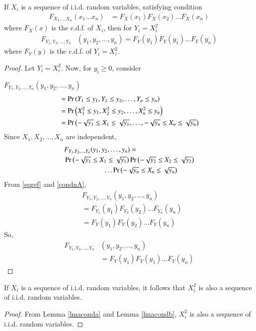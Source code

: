 \documentclass[journal,12pt,twocolumn]{IEEEtran}
\begin{document}
\begin{lemma} \label{lmacondb}
    If $X_i$ is a sequence of i.i.d. random variables, satisfying condition
    \begin{align}
        F_{X_1,\ldots X_n}(x_1\ldots x_n)&=F_X(x_1)F_X(x_2)\ldots F_X(x_n)\label{maincondnB}
    \end{align} 
    where $F_{X}(x)$ is the c.d.f. of $X_i$, then for $Y_i = X_i^2$
    \begin{align}
    F_{Y_1,Y_2,\dots,Y_n}&(y_1,y_2,\dots,y_n)=F_Y(y_1)F_Y(y_1)\dots F_Y(y_n)
    \end{align}
    where $F_Y(y)$ is the c.d.f. of $Y_i=X_i^2$.
\end{lemma}
\begin{proof}
Let $Y_i = X_i^2$.
Now, for $y_i\geq0$, consider

\begin{math}
    F_{Y_1,Y_2,\ldots,Y_n}(y_1,y_2,\ldots,y_n)
\end{math}
\begin{align}
    &=\Pr\left(Y_1 \leq y_1,Y_2 \leq y_2,\ldots,Y_n \leq y_n\right)\\
    &=\Pr\left(X_1^2 \leq y_1,X_2^2 \leq y_2,\ldots,X_n^2 \leq y_n\right)\\
    &=\Pr\left(-\sqrt{y_1} \leq X_1 \leq \sqrt{y_1},\ldots,-\sqrt{y_n} \leq X_n \leq \sqrt{y_n}\right)
\end{align}
Since $X_1,X_2,\ldots,X_n$ are independent,
\begin{align}
    &F_{Y_1,Y_2,\dots,Y_n}(y_1,y_2,\dots,y_n)= \nonumber\\
    &\Pr\left(-\sqrt{y_1} \leq X_1 \leq \sqrt{y_1}\right) \Pr\left(-\sqrt{y_2} \leq X_2 \leq \sqrt{y_2}\right) \nonumber\\
    &\hspace{2cm} \dots \Pr\left(-\sqrt{y_n} \leq X_n \leq \sqrt{y_n}\right)
\end{align}
From \eqref{eqref} and \eqref{condnA},
\begin{align}
    &F_{Y_1,Y_2,\dots,Y_n}(y_1,y_2,\dots,y_n) \nonumber \\
    &=F_{Y_1}(y_1) F_{Y_2}(y_2)\dots F_{Y_n}(y_n)\\
    &=F_Y(y_1) F_Y(y_2) \dots F_Y(y_n)
\end{align}
So,
\begin{align} \label{condnB}
    F_{Y_1,Y_2,\dots,Y_n}&(y_1,y_2,\dots,y_n)\nonumber \\
    &=F_Y(y_1)F_Y(y_1)\dots F_Y(y_n)
\end{align}
\end{proof}
\begin{lemma} \label{xi2lma}
If ${X_i}$ is a sequence of i.i.d. random variables, it follows that $X_i^2$ is also a sequence of i.i.d. random variables.
\end{lemma}
\begin{proof}
    From Lemma \ref{lmaconda} and Lemma \ref{lmacondb}, $X_i^2$ is also a sequence of i.i.d. random variables.
\end{proof}
\end{document}
